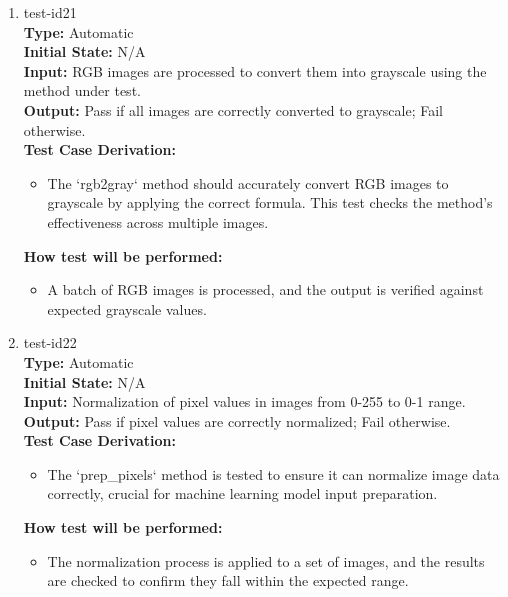 \documentclass[12pt, titlepage]{article}
\begin{document}
\begin{enumerate}
\item{test-id21\\}
\textbf{Type:} Automatic\\
\textbf{Initial State:} N/A\\
\textbf{Input:} RGB images are processed to convert them into grayscale 
using the method under test.\\
\textbf{Output:} Pass if all images are correctly converted to grayscale; Fail otherwise.\\
\textbf{Test Case Derivation:}
\begin{itemize}
    \item The `rgb2gray` method should accurately convert RGB images to grayscale 
    by applying the correct formula. This test checks the method's effectiveness across multiple images.
\end{itemize}
\textbf{How test will be performed:}
\begin{itemize}
    \item A batch of RGB images is processed, and the output is verified 
    against expected grayscale values.
\end{itemize}

\item{test-id22\\}
\textbf{Type:} Automatic\\
\textbf{Initial State:} N/A\\
\textbf{Input:} Normalization of pixel values in images from 0-255 to 0-1 range.\\
\textbf{Output:} Pass if pixel values are correctly normalized; Fail otherwise.\\
\textbf{Test Case Derivation:}
\begin{itemize}
    \item The `prep\_pixels` method is tested to ensure it can normalize image data 
    correctly, crucial for machine learning model input preparation.
\end{itemize}
\textbf{How test will be performed:}
\begin{itemize}
    \item The normalization process is applied to a set of images, and the results 
    are checked to confirm they fall within the expected range.
\end{itemize}


\end{enumerate}
\end{document}
